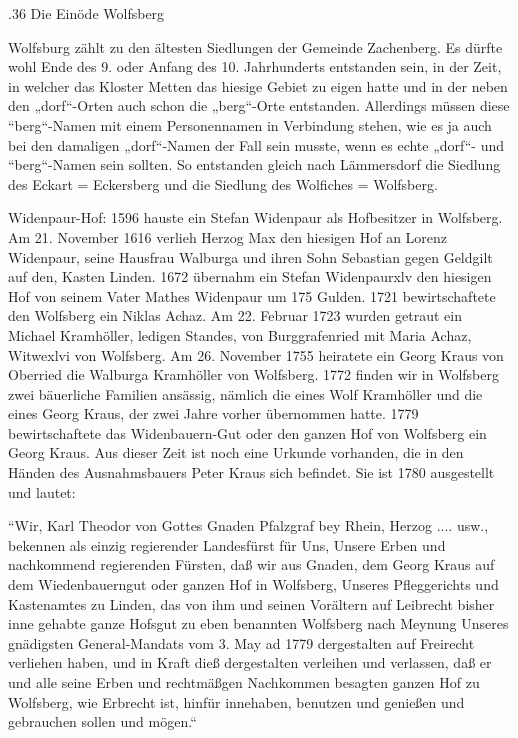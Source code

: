 \documentclass{book}
\begin{document}
.36 Die Einöde Wolfsberg

Wolfsburg zählt zu den ältesten Siedlungen der Gemeinde Zachenberg. Es dürfte
wohl Ende des 9. oder Anfang des 10. Jahrhunderts entstanden sein, in der Zeit,
in welcher das Kloster Metten das hiesige Gebiet zu eigen hatte und in der neben
den „dorf“-Orten auch schon die „berg“-Orte entstanden. Allerdings müssen diese
“berg“-Namen mit einem Personennamen in Verbindung stehen, wie es ja auch bei
den damaligen „dorf“-Namen der Fall sein musste, wenn es echte „dorf“- und
“berg“-Namen sein sollten. So entstanden gleich nach Lämmersdorf die Siedlung
des Eckart = Eckersberg und die Siedlung des Wolfiches = Wolfsberg.

Widenpaur-Hof: 1596 hauste ein Stefan Widenpaur als Hofbesitzer in Wolfsberg. Am
21. November 1616 verlieh Herzog Max den hiesigen Hof an Lorenz Widenpaur, seine
Hausfrau Walburga und ihren Sohn Sebastian gegen Geldgilt auf den, Kasten
Linden. 1672 übernahm ein Stefan Widenpaurxlv den hiesigen Hof von seinem Vater
Mathes Widenpaur um 175 Gulden. 1721 bewirtschaftete den Wolfsberg ein Niklas
Achaz. Am 22. Februar 1723 wurden getraut ein Michael Kramhöller, ledigen
Standes, von Burggrafenried mit Maria Achaz, Witwexlvi von Wolfsberg. Am 26.
November 1755 heiratete ein Georg Kraus von Oberried die Walburga Kramhöller von
Wolfsberg. 1772 finden wir in Wolfsberg zwei bäuerliche Familien ansässig,
nämlich die eines Wolf Kramhöller und die eines Georg Kraus, der zwei Jahre
vorher übernommen hatte. 1779 bewirtschaftete das Widenbauern-Gut oder den
ganzen Hof von Wolfsberg ein Georg Kraus. Aus dieser Zeit ist noch eine Urkunde
vorhanden, die in den Händen des Ausnahmsbauers Peter Kraus sich befindet. Sie
ist 1780 ausgestellt und lautet:

“Wir, Karl Theodor von Gottes Gnaden Pfalzgraf bey Rhein, Herzog .... usw.,
bekennen als einzig regierender Landesfürst für Uns, Unsere Erben und
nachkommend regierenden Fürsten, daß wir aus Gnaden, dem Georg Kraus auf dem
Wiedenbauerngut oder ganzen Hof in Wolfsberg, Unseres Pfleggerichts und
Kastenamtes zu Linden, das von ihm und seinen Vorältern auf Leibrecht bisher
inne gehabte ganze Hofsgut zu eben benannten Wolfsberg nach Meynung Unseres
gnädigsten General-Mandats vom 3. May ad 1779 dergestalten auf Freirecht
verliehen haben, und in Kraft dieß dergestalten verleihen und verlassen, daß er
und alle seine Erben und rechtmäßgen Nachkommen besagten ganzen Hof zu
Wolfsberg, wie Erbrecht ist, hinfür innehaben, benutzen und genießen und
gebrauchen sollen und mögen.“
\end{document}
